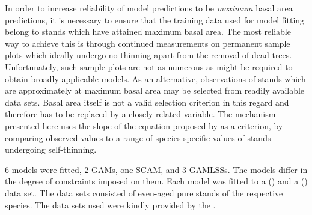 In order to increase reliability of model predictions to be \emph{maximum} basal area predictions, it is necessary to ensure that the training data used for model fitting belong to stands which have attained maximum basal area.  The most reliable way to achieve this is through continued measurements on permanent sample plots which ideally undergo no thinning apart from the removal of dead trees.  Unfortunately, such sample plots are not as numerous as might be required to obtain broadly applicable models.  As an alternative, observations of stands which are approximately at maximum basal area may be selected from readily available data sets.  Basal area itself is not a valid selection criterion in this regard and therefore has to be replaced by a closely related variable.  The mechanism presented here uses the slope of the equation proposed by \textcite{Reineke1933} as a criterion, by comparing observed values to a range of species-specific values of stands undergoing self-thinning.

6 models were fitted, 2 GAMs, one SCAM, and 3 GAMLSSs.  The models differ in the degree of constraints imposed on them.  Each model was fitted to a \BeechLong{} (\Beech{}) and a \SpruceLong{} (\Spruce{}) data set.  The data sets consisted of even-aged pure stands of the respective species.  The data sets used were kindly provided by the \NWFVA{}.


